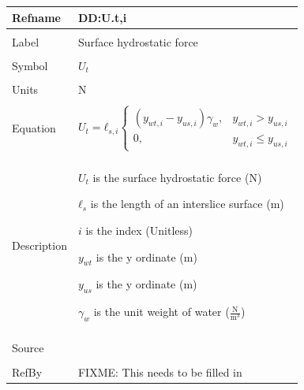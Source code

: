 \documentclass[12pt]{article}
\begin{document}
\noindent \begin{minipage}{\textwidth}
\begin{tabular}{p{} p{}}
\toprule \textbf{Refname} & \textbf{DD:U.t,i}
\label{DD:U.t,i}
\\ \midrule \\
Label & Surface hydrostatic force
\\ \midrule \\
Symbol & ${U_{t}}$
\\ \midrule \\
Units & N
\\ \midrule \\
Equation & \begin{dmath}
           {U_{t}}={ℓ_{s,i}} \begin{cases}
\left({y_{wt,i}}-{y_{us,i}}\right) {γ_{w}}, & {y_{wt,i}}>{y_{us,i}}\\
0, & {y_{wt,i}}\leq{}{y_{us,i}}
\end{cases}
           \end{dmath}
\\ \midrule \\
Description & \begin{symbDescription}
              \item{${U_{t}}$ is the surface hydrostatic force (N)}
              \item{${ℓ_{s}}$ is the length of an interslice surface (m)}
              \item{$i$ is the index (Unitless)}
              \item{${y_{wt}}$ is the y ordinate (m)}
              \item{${y_{us}}$ is the y ordinate (m)}
              \item{${γ_{w}}$ is the unit weight of water ($\frac{\text{N}}{\text{m}^{3}}$)}
              \end{symbDescription}
\\ \midrule \\
Source & 
\\ \midrule \\
RefBy & FIXME: This needs to be filled in
\\ \bottomrule \end{tabular}
\end{minipage}\\
~\newline
\end{document}

